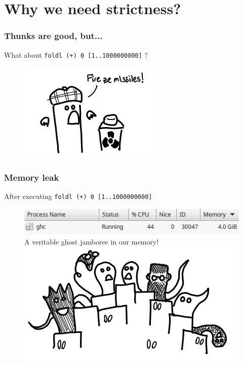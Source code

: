 \documentclass{beamer}
\newcommand{\inlinehaskell}[1]{\texttt{#1}}
\begin{document}
\section{Why we need strictness?}

\begin{frame}
\frametitle{Thunks are good, but...}
\bigskip
What about \inlinehaskell{foldl (+) 0 [1..1000000000]} ?\newline
\begin{figure}[hbt!]
    \centering
    \includegraphics[height=0.4\textheight]{./pic/evil-of-thunk.png}
\end{figure}
\end{frame}


\begin{frame}
\frametitle{Memory leak}
After executing \inlinehaskell{foldl (+) 0 [1..1000000000]}\newline
\begin{figure}[hbt!]
    \centering
    \includegraphics[height=0.1\textheight]{./pic/memory-usage-ghc.png}
    \newline\newline
    A veritable ghost jamboree in our memory!
    \includegraphics[height=0.4\textheight]{./pic/ghost-party.png}
\end{figure}
\end{frame}
\end{document}
